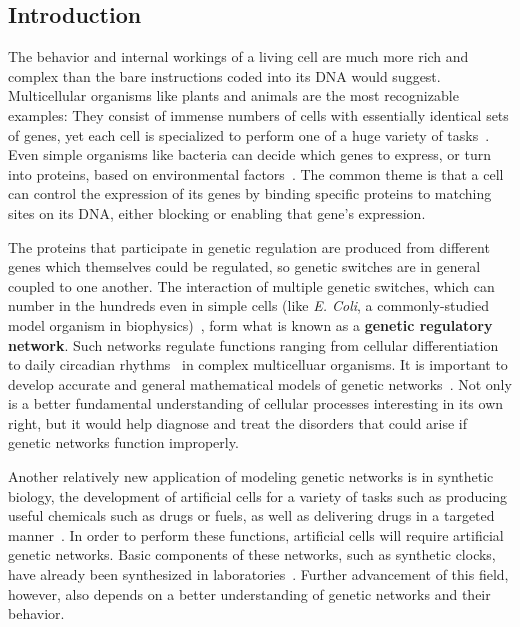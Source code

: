 \documentclass[english,letterpaper,12pt]{report}
\newcommand{\defkeywd}[1]{\textbf{#1}}
\begin{document}
\pagebreak[4]

\tableofcontents

\begin{doublespacing}


\chapter{Introduction} %
\label{sec:introduction}


The behavior and internal workings of a living cell are much more rich and complex than the bare instructions coded into its DNA would suggest. Multicellular organisms like plants and animals are the most recognizable examples: They consist of immense numbers of cells with essentially identical sets of genes, yet each cell is specialized to perform one of a huge variety of tasks~\cite{grn-review}. Even simple organisms like bacteria can decide which genes to express, or turn into proteins, based on environmental factors~\cite{ecoli-decision}.  The common theme is that a cell can control the expression of its genes by binding specific proteins to matching sites on its DNA, either blocking or enabling that gene's expression.

The proteins that participate in genetic regulation are produced from different genes which themselves could be regulated, so genetic switches are in general coupled to one another. The interaction of multiple genetic switches, which can number in the hundreds even in simple cells (like \textit{E. Coli}, a commonly-studied model organism in biophysics)~\cite{ecoli-operons}, form what is known as a \defkeywd{genetic regulatory network}. Such networks regulate functions ranging from cellular differentiation~\cite{grn-review} to daily circadian rhythms~\cite{circ-rhythm-review} in complex multicelluar organisms. It is important to develop accurate and general mathematical models of genetic networks~\cite{review-in-numero}. Not only is a better fundamental understanding of cellular processes interesting in its own right, but it would help diagnose and treat the disorders that could arise if genetic networks function improperly.

Another relatively new application of modeling genetic networks is in synthetic biology, the development of artificial cells for a variety of tasks such as producing useful chemicals such as drugs or fuels, as well as delivering drugs in a targeted manner~\cite{synth-bio-applications}. In order to perform these functions, artificial cells will require artificial genetic networks. Basic components of these networks, such as synthetic clocks, have already been synthesized in laboratories~\cite{synth-osc}. Further advancement of this field, however, also depends on a better understanding of genetic networks and their behavior.


\end{doublespacing}
\end{document}
